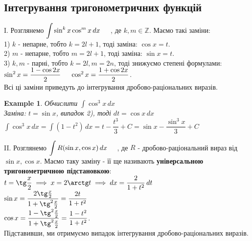 \documentclass[a4paper, 10pt]{article}
\def\huge{\displaystyle}
\theoremstyle{theoremdd}
\theoremstyle{theoremdd}
\theoremstyle{theoremdd}
\theoremstyle{theoremdd}
\theoremstyle{theoremdd}
\newtheorem{example}[theorem]{Example}
\theoremstyle{theoremdd}
\theoremstyle{theoremdd}
\theoremstyle{theoremdd}
\theoremstyle{theoremdd}
\begin{document}
\subsection{Інтегрування тригонометричних функцій}
I. Розглянемо $\huge \int \sin^k x \cos^m x \,dx \hspace{0.5cm}$, де $k,m \in \mathbb{Z}$. Маємо такі заміни:\\
1) $k$ - непарне, тобто $k = 2l+1$, тоді заміна: $\cos x = t$.
\bigskip \\
2) $m$ - непарне, тобто $m = 2l+1$, тоді заміна: $\sin x = t$.
\bigskip \\
3) $k,m$ - парні, тобто $k=2l, m =2n$, тоді знижуємо степені формулами: \\ $\sin^2 x = \dfrac{1-\cos 2x}{2} \hspace{0.5cm} \cos^2 x = \dfrac{1+\cos 2x}{2}$.
\bigskip \\
Всі ці заміни приведуть до інтегрування дробово-раціональних виразів.

\begin{example}
Обчислити $\huge\int \cos^3 x \,dx$\\
Заміна: $t = \sin x$, випадок 2), тоді $dt = \cos x \,dx$\\
$\huge\int \cos^3 x \,dx = \int (1-t^2)\,dx = t - \dfrac{t^3}{3} + C = \sin x - \dfrac{\sin^3 x}{3} + C$
\end{example}

II. Розглянемо $\huge \int R(\sin x, \cos x)\,dx \hspace{0.5cm}$, де $R$ - дробово-раціональний вираз від $\sin x, \cos x$. Маємо таку заміну - її ще називають \textbf{універсальною тригонометричною підстановкою}:\\
$t = \tg \dfrac{x}{2} \implies x = 2 \arctg t \implies dx = \dfrac{2}{1+t^2}\,dt$\\
$\sin x = \dfrac{2 \tg \frac{x}{2}}{1 + \tg^2 \frac{x}{2}} = \dfrac{2t}{1+t^2}$\\
$\cos x = \dfrac{1 - \tg^2 \frac{x}{2}}{1 + \tg^2 \frac{x}{2}} = \dfrac{1-t^2}{1+t^2}$.\\
Підставивши, ми отримуємо випадок інтегрування дробово-раціональних виразів.
\end{document}
